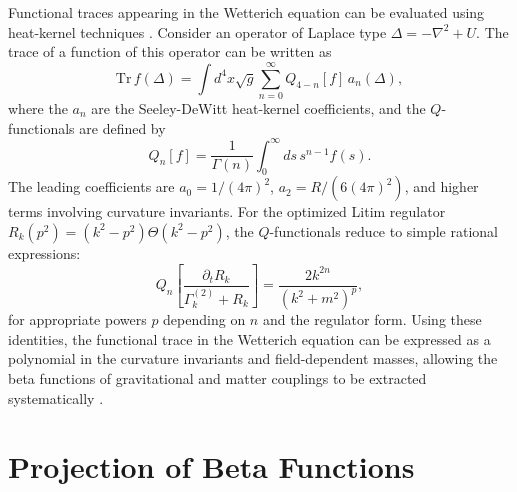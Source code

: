 \documentclass[12pt,a4paper]{article}
\begin{document}
Functional traces appearing in the Wetterich equation can be evaluated using
heat-kernel techniques \cite{Berges2002,Dupuis2021}. Consider an operator
of Laplace type $\Delta = -\nabla^2 + U$. The trace of a function of this
operator can be written as
\begin{equation}
\mathrm{Tr}\, f(\Delta)
=
\int d^4x \sqrt{g}
\sum_{n=0}^{\infty}
Q_{4-n}[f]\, a_n(\Delta),
\end{equation}
where the $a_n$ are the Seeley-DeWitt heat-kernel coefficients, and the
$Q$-functionals are defined by
\begin{equation}
Q_n[f]
=
\frac{1}{\Gamma(n)}
\int_0^\infty ds\, s^{n-1} f(s).
\end{equation}
The leading coefficients are $a_0 = 1/(4\pi)^2$, $a_2 = R/(6(4\pi)^2)$,
and higher terms involving curvature invariants. For the optimized Litim
regulator $R_k(p^2) = (k^2 - p^2)\Theta(k^2 - p^2)$, the $Q$-functionals
reduce to simple rational expressions:
\begin{equation}
Q_n\!\left[\frac{\partial_t R_k}{\Gamma_k^{(2)}+R_k}\right]
=
\frac{2k^{2n}}{(k^2 + m^2)^p},
\end{equation}
for appropriate powers $p$ depending on $n$ and the regulator form. Using
these identities, the functional trace in the Wetterich equation can be
expressed as a polynomial in the curvature invariants and field-dependent
masses, allowing the beta functions of gravitational and matter couplings to
be extracted systematically \cite{Pawlowski2007,Berges2002}.

\section{Projection of Beta Functions}
\label{app:projection}
\end{document}
